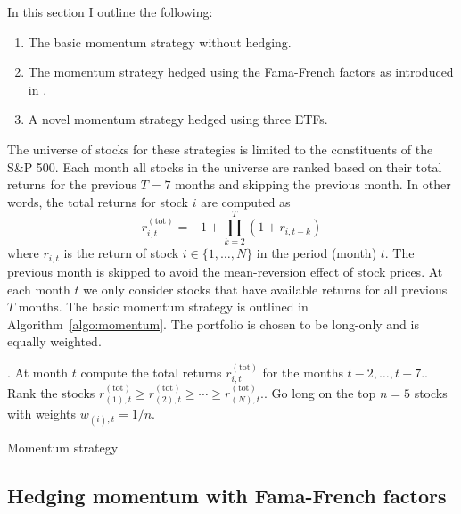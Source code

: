 \documentclass[10pt, letterpaper]{article}
\begin{document}
In this section I outline the following:
\begin{enumerate}
\item The basic momentum strategy without hedging.

\item The momentum strategy hedged using the Fama-French factors as introduced in \cite{MvO}.

\item A novel momentum strategy hedged using three ETFs.
\end{enumerate}
The universe of stocks for these strategies is limited to the constituents of the S\&P 500.  Each month all stocks in the universe are ranked based on their total returns for the previous $T = 7$ months and skipping the previous month.  In other words, the total returns for stock $i$ are computed as
\[
	r_{i,t}^{(\text{tot})} = -1 + \prod_{k = 2}^{T} (1 + r_{i,t - k})
\]
where $r_{i,t}$ is the return of stock $i \in \{1,\ldots,N\}$ in the period (month) $t$.  The previous month is skipped to avoid the mean-reversion effect of stock prices.  At each month $t$ we only consider stocks that have available returns for all previous $T$ months.  The basic momentum strategy is outlined in Algorithm~\ref{algo:momentum}.  The portfolio is chosen to be long-only and is equally weighted.



\begin{algorithm}[H]
.  At month $t$ compute the total returns $r^{(\text{tot})}_{i,t}$ for the months $t - 2,\ldots,t - 7$..  Rank the stocks $r^{(\text{tot})}_{(1),t} \ge r^{(\text{tot})}_{(2),t} \ge \cdots \ge r^{(\text{tot})}_{(N),t}$..  Go long on the top $n = 5$ stocks with weights $w_{(i),t} = 1/n$.\;
 \caption{Momentum strategy}
 \label{algo:momentum}
\end{algorithm}



\subsection{Hedging momentum with Fama-French factors}
\end{document}
